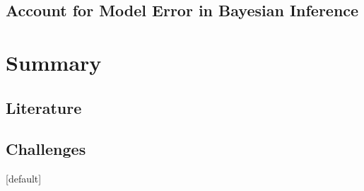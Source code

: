 \documentclass[compress]{beamer}
\begin{document}


\subsection[Model Error]{Account for Model Error in Bayesian Inference}








%
\section[Summary]{Summary}

\subsection[Literature]{Literature}


\subsection[Challenges]{Challenges}




\addtocounter{framenumber}{-39}
[default]






\end{document}
